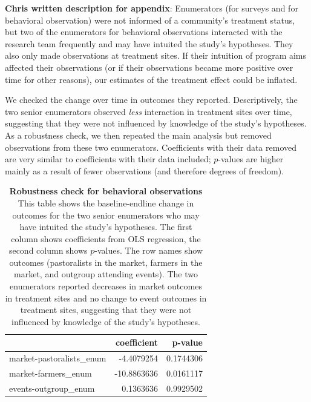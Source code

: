 \documentclass[
]{article}
\begin{document}
\textbf{Chris written description for appendix}: Enumerators (for
surveys and for behavioral observation) were not informed of a
community's treatment status, but two of the enumerators for behavioral
observations interacted with the research team frequently and may have
intuited the study's hypotheses. They also only made observations at
treatment sites. If their intuition of program aims affected their
observations (or if their observations became more positive over time
for other reasons), our estimates of the treatment effect could be
inflated.

We checked the change over time in outcomes they reported.
Descriptively, the two senior enumerators observed \emph{less}
interaction in treatment sites over time, suggesting that they were not
influenced by knowledge of the study's hypotheses. As a robustness
check, we then repeated the main analysis but removed observations from
these two enumerators. Coefficients with their data removed are very
similar to coefficients with their data included; \(p\)-values are
higher mainly as a result of fewer observations (and therefore degrees
of freedom).

\begin{table}[H]
\begin{center}
\label{tab:behObs_enumsOnly_tab}
\caption{\textbf{Robustness check for behavioral observations} This table shows the baseline-endline change in outcomes for the two senior enumerators who may have intuited the study's hypotheses. The first column shows coefficients from OLS regression, the second column shows $p$-values. The row names show outcomes (pastoralists in the market, farmers in the market, and outgroup attending events). The two enumerators reported decreases in market outcomes in treatment sites and no change to event outcomes in treatment sites, suggesting that they were not influenced by knowledge of the study's hypotheses.}
\smallskip

\begin{tabular}{l|r|r}
\hline
  & coefficient & p-value\\
\hline
market-pastoralists\_enum & -4.4079254 & 0.1744306\\
\hline
market-farmers\_enum & -10.8863636 & 0.0161117\\
\hline
events-outgroup\_enum & 0.1363636 & 0.9929502\\
\hline
\end{tabular}


\end{center}
\end{table}
\end{document}

